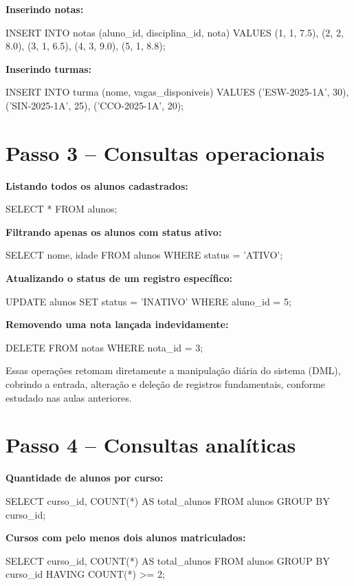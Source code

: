 \textbf{Inserindo notas:}
\begin{sqlcode}
INSERT INTO notas (aluno_id, disciplina_id, nota) VALUES
(1, 1, 7.5),
(2, 2, 8.0),
(3, 1, 6.5),
(4, 3, 9.0),
(5, 1, 8.8);
\end{sqlcode}

\textbf{Inserindo turmas:}
\begin{sqlcode}
INSERT INTO turma (nome, vagas_disponiveis) VALUES
('ESW-2025-1A', 30),
('SIN-2025-1A', 25),
('CCO-2025-1A', 20);
\end{sqlcode}

\section{Passo 3 -- Consultas operacionais}

\textbf{Listando todos os alunos cadastrados:}
\begin{sqlcode}
SELECT *
FROM alunos;
\end{sqlcode}

\textbf{Filtrando apenas os alunos com status ativo:}
\begin{sqlcode}
SELECT nome, idade
FROM alunos
WHERE status = 'ATIVO';
\end{sqlcode}

\textbf{Atualizando o status de um registro específico:}
\begin{sqlcode}
UPDATE alunos
SET status = 'INATIVO'
WHERE aluno_id = 5;
\end{sqlcode}

\textbf{Removendo uma nota lançada indevidamente:}
\begin{sqlcode}
DELETE FROM notas
WHERE nota_id = 3;
\end{sqlcode}

Essas operações retomam diretamente a manipulação diária do sistema (DML), cobrindo a entrada, alteração e deleção de registros fundamentais, conforme estudado nas aulas anteriores.

\section{Passo 4 -- Consultas analíticas}

\textbf{Quantidade de alunos por curso:}
\begin{sqlcode}
SELECT
    curso_id,
    COUNT(*) AS total_alunos
FROM alunos
GROUP BY curso_id;
\end{sqlcode}

\textbf{Cursos com pelo menos dois alunos matriculados:}
\begin{sqlcode}
SELECT
    curso_id,
    COUNT(*) AS total_alunos
FROM alunos
GROUP BY curso_id
HAVING COUNT(*) >= 2;
\end{sqlcode}


